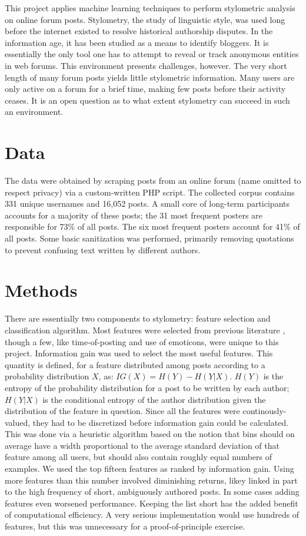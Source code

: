 \documentclass[12pt,letterpaper,onecolumn,oneside]{article}
\numberwithin{equation}{section}
\numberwithin{figure}{section}
\begin{document}
This project applies machine learning techniques to perform stylometric analysis on online forum posts. Stylometry, the study of linguistic style, was used long before the internet existed to resolve historical 
authorship disputes. In the information age, it has been studied as a means to identify bloggers. It is essentially the only tool one has to attempt to reveal or track anonymous entities in web forums. This 
environment presents challenges, however. The very short length of many forum posts yields little stylometric information. Many users are only active on a forum for a brief time, making few posts before their 
activity ceases. It is an open question as to what extent stylometry can succeed in such an environment.

\section{Data}
The data were obtained by scraping posts from an online forum (name omitted to respect privacy) via a custom-written PHP script. The collected corpus contains 331 unique usernames and 16,052 posts. A small core of 
long-term participants accounts for a majority of these posts; the 31 most frequent posters are responsible for 73\% of all posts. The six most frequent posters account for 41\% of all posts. Some basic 
sanitization was performed, primarily removing quotations to prevent confusing text written by different authors.

\section{Methods}
There are essentially two components to stylometry: feature selection and classification algorithm. Most features were selected from previous literature \cite{anonymouth,stanford}, though a few, like 
time-of-posting and use of emoticons, were unique to this project. Information gain was used to select the most useful features. This quantity is defined, for a feature distributed among posts according to a 
probability distribution \(X\), as: \(IG(X) = H(Y) - H(Y|X)\). \(H(Y)\) is the entropy of the probability distribution for a post to be written by each author; \(H(Y|X)\) is the conditional entropy of the author 
distribution given the distribution of the feature in question. Since all the features were continously-valued, they had to be discretized before information gain could be calculated. This was done via a heuristic 
algorithm based on the notion that bins should on average have a width proportional to the average standard deviation of that feature among all users, but should also contain roughly equal numbers of examples. We 
used the top fifteen features as ranked by information gain. Using more features than this number involved diminishing returns, likey linked in part to the high frequency of short, ambiguously authored posts. In some 
cases adding features even worsened performance. Keeping the list short has the added benefit of computational efficiency. A very serious implementation would use hundreds of features, but this was unnecessary for a 
proof-of-principle exercise.
\end{document}
